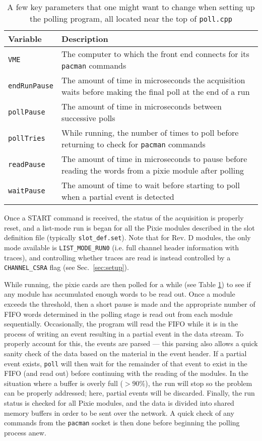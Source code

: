 \documentclass{article}
\begin{document}
\begin{table}[htp]
\label{tab:poll_parameters}
\caption{A few key parameters that one might want to change when setting up the polling program, all located near the top of \texttt{poll.cpp}}
\begin{tabular}{lp{3.5in}}
\hline
Variable & Description \\
\hline
\texttt{VME} & The computer to which the front end connects for its \texttt{pacman} commands \\
\texttt{endRunPause} & The amount of time in microseconds the acquisition waits before making the final poll at the end of a run \\ 
\texttt{pollPause} & The amount of time in microseconds between successive polls \\
\texttt{pollTries} & While running, the number of times to poll before returning to check for \texttt{pacman} commands \\
\texttt{readPause} & The amount of time in microseconds to pause before reading the words from a pixie module after polling \\
\texttt{waitPause} & The amount of time to wait before starting to poll when a partial event is detected \\
\end{tabular}
\end{table}

Once a \textsc{START} command is received, the status of the acquisition is properly reset, and a list-mode run is began for all the Pixie modules described in the slot definition file (typically \texttt{slot\_def.set}). Note that for Rev. D modules, the only mode available is \texttt{LIST\_MODE\_RUN0} (i.e. full channel header information with traces), and controlling whether traces are read is instead controlled by a \texttt{CHANNEL\_CSRA} flag (see Sec.~\ref{sec:setup}).

While running, the pixie cards are then polled for a while (see Table \ref{tab:poll_parameters}) to see if any module has accumulated enough words to be read out. Once a module exceeds the threshold, then a short pause is made and the appropriate number of FIFO words determined in the polling stage is read out from each module sequentially. Occasionally, the program will read the FIFO while it is in the process of writing an event resulting in a partial event in the data stream. To properly account for this, the events are parsed --- this parsing also allows a quick sanity check of the data based on the material in the event header. If a partial event exists, \texttt{poll} will then wait for the remainder of that event to exist in the FIFO (and read out) before continuing with the reading of the modules. In the situation where a buffer is overly full ($>90\%$), the run will stop so the problem can be properly addressed; here, partial events will be discarded. Finally, the run status is checked for all Pixie modules, and the data is divided into shared memory buffers in order to be sent over the network. A quick check of any commands from the \texttt{pacman} socket is then done before beginning the polling process anew.
\end{document}
